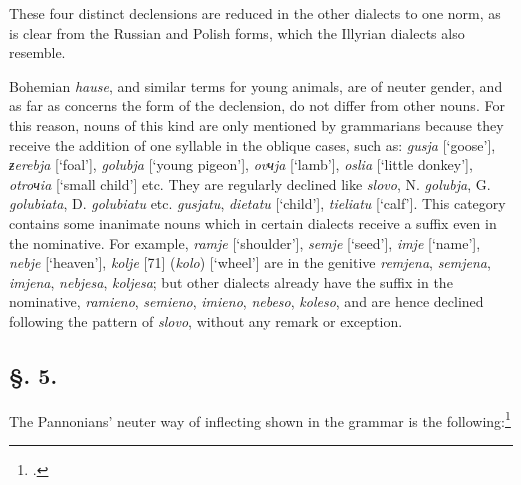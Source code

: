 These four distinct declensions are reduced in the other dialects to one norm, as is clear from the Russian and Polish forms, which the Illyrian dialects also resemble.

Bohemian \textit{hause}, and similar terms for young animals, are of neuter gender, and as far as concerns the form of the declension, do not differ from other nouns. For this reason, nouns of this kind are only mentioned by grammarians because they receive the addition of one syllable in the oblique cases, such as: \textit{gusja} [‘goose’], \textit{ƶerebja} [‘foal’], \textit{golubja} [‘young pigeon’], \textit{ovчja} [‘lamb’], \textit{oslia} [‘little donkey’], \textit{otroчia} [‘small child’] etc. They are regularly declined like \textit{slovo}, N. \textit{golubja}, G. \textit{golubiata}, D. \textit{golubiatu} etc. \textit{gusjatu}, \textit{dietatu} [‘child’], \textit{tieliatu} [‘calf’]. This category contains some inanimate nouns which in certain dialects receive a suffix even in the nominative. For example, \textit{ramje} [‘shoulder’], \textit{semje} [‘seed’], \textit{imje} [‘name’], \textit{nebje} [‘heaven’], \textit{kolje} [71] (\textit{kolo}) [‘wheel’] are in the genitive \textit{remjena}, \textit{semjena}, \textit{imjena}, \textit{nebjesa}, \textit{koljesa}; but other dialects already have the suffix in the nominative, \textit{ramieno}, \textit{semieno}, \textit{imieno}, \textit{nebeso}, \textit{koleso}, and are hence declined following the pattern of \textit{slovo}, without any remark or exception.

\subsection*{\hspace*{\fill}§. 5.\hspace*{\fill}}

The Pannonians’ neuter way of inflecting shown in the grammar is the following:\footnote{\citet[41--42]{bernolak_grammatica_1790}.}

